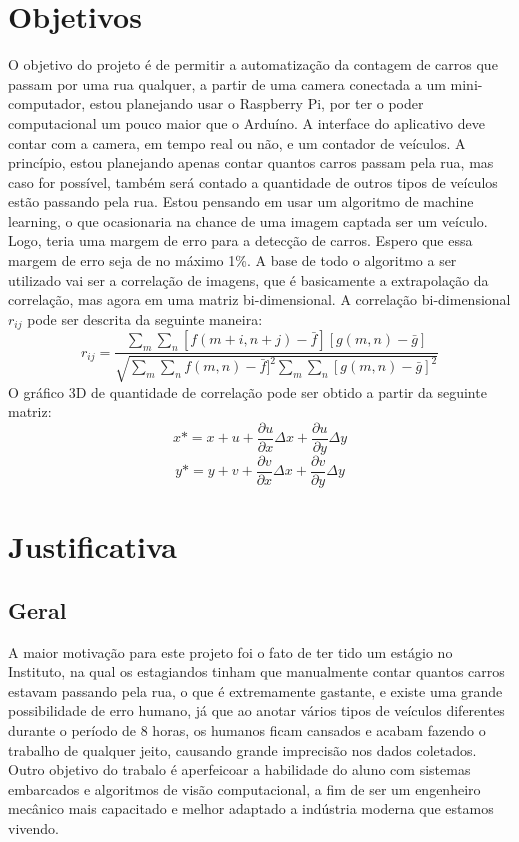 \documentclass[14pt]{scrartcl} %
\begin{document}
\section{Objetivos}
	O objetivo do projeto é de permitir a automatização da contagem de carros que passam por uma rua qualquer, a partir de uma camera conectada a um mini-computador, estou planejando usar o Raspberry Pi, por ter o poder computacional um pouco maior que o Arduíno. A interface do aplicativo deve contar com a camera, em tempo real ou não, e um contador de veículos. A princípio, estou planejando apenas contar quantos carros passam pela rua, mas caso for possível, também será contado a quantidade de outros tipos de veículos estão passando pela rua.
\newline 	Estou pensando em usar um algoritmo de machine learning, o que ocasionaria na chance de uma imagem captada ser um veículo. Logo, teria uma margem de erro para a detecção de carros. Espero que essa margem de erro seja de no máximo 1\%. \newline
	A base de todo o algoritmo a ser utilizado vai ser a correlação de imagens, que é basicamente a extrapolação da correlação, mas agora em uma matriz bi-dimensional.  A correlação bi-dimensional $r_{ij}$ pode ser descrita da seguinte maneira:  \newline
\begin{equation}
\label{eq:primitiva}
r_{ij}=\frac{\sum_{m}\sum_{n}[f(m+i,n+j)-\bar{f}][g(m,n)-\bar{g}]}{\sqrt{\sum_{m}\sum_{n}f(m,n)-\bar{f}]^{2}\sum_{m}\sum_{n}[g(m,n)-\bar{g}]^2}}
\end{equation}
	O gráfico 3D de quantidade de correlação pode ser obtido a partir da seguinte matriz:
\begin{equation}
\label{eq:def}
x* = x+u+\frac{\partial u}{\partial x} \Delta x+\frac{\partial u}{\partial y}\Delta y
\end{equation}
\newline
\begin{equation}
\label{eq:def}
y* = y+v+\frac{\partial v}{\partial x} \Delta x+\frac{\partial v}{\partial y}\Delta y
\end{equation}
\section{Justificativa}
\subsection{Geral}
	A maior motivação para este projeto foi o fato de ter tido um estágio no Instituto, na qual os estagiandos tinham que manualmente contar quantos carros estavam passando pela rua, o que é extremamente gastante, e existe uma grande possibilidade de erro humano, já que ao anotar vários tipos de veículos diferentes durante o período de 8 horas, os humanos ficam cansados e acabam fazendo o trabalho de qualquer jeito, causando grande imprecisão nos dados coletados. \newline
	Outro objetivo do trabalo é aperfeicoar a habilidade do aluno com sistemas embarcados e algoritmos de visão computacional, a fim de ser um engenheiro mecânico mais capacitado e melhor adaptado a indústria moderna que estamos vivendo.
\end{document}
